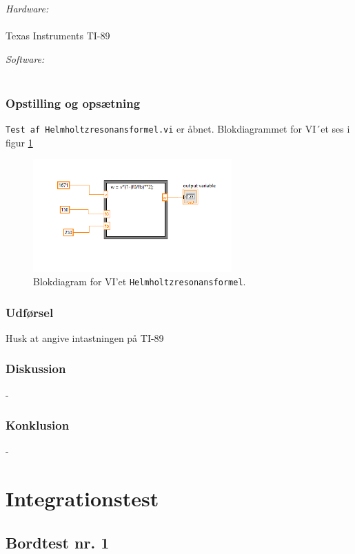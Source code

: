 		\textit{Hardware:}\\
		\PC\\
		Texas Instruments TI-89
	
		\textit{Software:}\\
		\labview\\
	
		\subsubsection{Opstilling og opsætning}
		\texttt{Test af Helmholtzresonansformel.vi} er åbnet. Blokdiagrammet for VI´et ses i figur \ref{fig:HHRF} 
		
		\begin{figure}
			\centering
			\includegraphics[width=3in]{HelmholtzformelLabVIEW}
			\caption{Blokdiagram for VI'et \texttt{Helmholtzresonansformel}.}
			\label{fig:HHRF}
		\end{figure}
	
		\subsubsection{Udførsel}
			 
			 Husk at angive intastningen på TI-89

		\subsubsection{Diskussion} 
	-
	
	
		\subsubsection{Konklusion}
		 
	- 




\section{Integrationstest}

	\subsection{Bordtest nr. 1} %
	\label{bordtest1}
